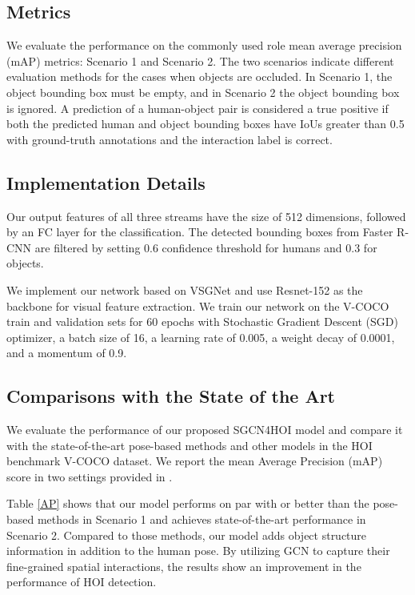 \documentclass[a4paper, 10pt, conference]{IEEEtran}
\begin{document}
\subsection{Metrics}
We evaluate the performance on the commonly used role mean average precision (mAP) metrics: Scenario 1 and Scenario 2. The two scenarios indicate different evaluation methods for the cases when objects are occluded. In Scenario 1, the object bounding box must be empty, and in Scenario 2 the object bounding box is ignored. A prediction of a human-object pair is considered a true positive if both the predicted human and object bounding boxes have IoUs greater than 0.5 with ground-truth annotations and the interaction label is correct. 


\subsection{Implementation Details}
Our output features of all three streams have the size of 512 dimensions, followed by an FC layer for the classification. The detected bounding boxes from Faster R-CNN \cite{Faster-R-CNN} are filtered by setting 0.6 confidence threshold for humans and 0.3 for objects.

We implement our network based on VSGNet \cite{VSGNet} and use Resnet-152 \cite{ResNet} as the backbone for visual feature extraction. We train our network on the V-COCO train and validation sets for 60 epochs with Stochastic Gradient Descent (SGD) optimizer, a batch size of 16, a learning rate of 0.005, a weight decay of 0.0001, and a momentum of 0.9. 

\subsection{Comparisons with the State of the Art}
We evaluate the performance of our proposed SGCN4HOI model and compare it with the state-of-the-art pose-based methods and other models in the HOI benchmark V-COCO dataset. We report the mean Average Precision (mAP) score in two settings provided in \cite{VSRL}.

Table \ref{AP} shows that our model performs on par with or better than the pose-based methods in Scenario 1 and achieves state-of-the-art performance in Scenario 2. Compared to those methods, our model adds object structure information in addition to the human pose. By utilizing GCN to capture their fine-grained spatial interactions, the results show an improvement in the performance of HOI detection. 
\end{document}
